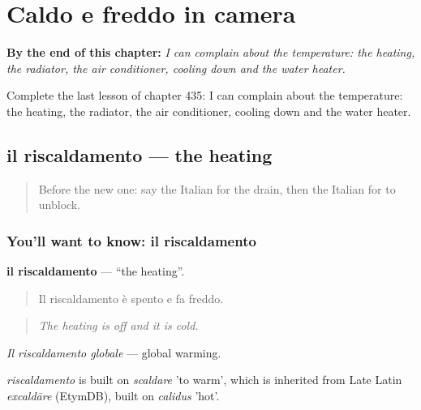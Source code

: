 
\chapter{Caldo e freddo in camera}
\label{ch:it-caldo-e-freddo-in-camera}

\begin{chapteropening}
\textbf{By the end of this chapter:} \emph{I can complain about the temperature: the heating, the radiator, the air conditioner, cooling down and the water heater.}

Complete the last lesson of chapter 435: I can complain about the temperature: the heating, the radiator, the air conditioner, cooling down and the water heater.
\end{chapteropening}

\section[il riscaldamento]{il riscaldamento — the heating}

\label{lesson:IT-C435-riscaldamento}



\begin{quote}
Before the new one: say the Italian for the drain, then the Italian for to unblock.
\end{quote}

\subsection*{You'll want to know: il riscaldamento}
\textbf{il riscaldamento} — \textquotedblleft{}the heating\textquotedblright{}.

\begin{quote}
Il riscaldamento è spento e fa freddo.
\end{quote}

\begin{quote}
\emph{The heating is off and it is cold.}
\end{quote}

\emph{Il riscaldamento globale} — global warming.

\begin{cousinweb}
\emph{riscaldamento} is built on \emph{scaldare} 'to warm', which is inherited from Late Latin \emph{excaldāre} (EtymDB), built on \emph{calidus} 'hot'.
\end{cousinweb}

